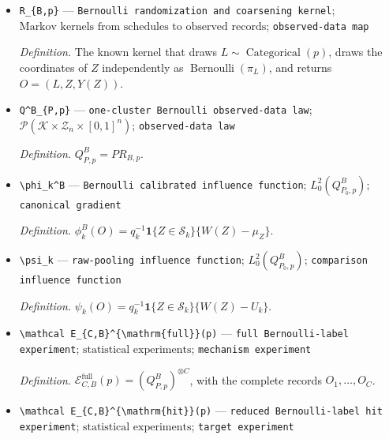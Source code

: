 \documentclass{article}
\begin{document}
\begin{itemize}
  \item \texttt{R\_\allowbreak{}\{B,\allowbreak{}p\}\allowbreak{}} --- \texttt{Bernoulli randomization and coarsening kernel}; \(\text{Markov kernels from schedules to observed records}\); \texttt{observed-\allowbreak{}data map}
  \par\smallskip\noindent\emph{Definition.} The known kernel that draws \(L\sim\operatorname{Categorical}(p)\), draws the coordinates of \(Z\) independently as \(\operatorname{Bernoulli}(\pi_L)\), and returns \(O=(L,Z,Y(Z))\).
  \item \texttt{Q\textasciicircum{}B\_\allowbreak{}\{P,\allowbreak{}p\}\allowbreak{}} --- \texttt{one-\allowbreak{}cluster Bernoulli observed-\allowbreak{}data law}; \(\mathcal P(\mathcal K\times\mathcal Z_n\times[0,1]^n)\); \texttt{observed-\allowbreak{}data law}
  \par\smallskip\noindent\emph{Definition.} \(Q^B_{P,p}=P R_{B,p}\).
  \item \texttt{\textbackslash{}\allowbreak{}phi\_\allowbreak{}k\textasciicircum{}B} --- \texttt{Bernoulli calibrated influence function}; \(L^2_0(Q^B_{P_0,p})\); \texttt{canonical gradient}
  \par\smallskip\noindent\emph{Definition.} \(\phi_k^B(O)=q_k^{-1}\mathbf 1\{Z\in\mathcal S_k\}\{W(Z)-\mu_Z\}\).
  \item \texttt{\textbackslash{}\allowbreak{}psi\_\allowbreak{}k} --- \texttt{raw-\allowbreak{}pooling influence function}; \(L^2_0(Q^B_{P_0,p})\); \texttt{comparison influence function}
  \par\smallskip\noindent\emph{Definition.} \(\psi_k(O)=q_k^{-1}\mathbf 1\{Z\in\mathcal S_k\}\{W(Z)-U_k\}\).
  \item \texttt{\textbackslash{}\allowbreak{}mathcal E\_\allowbreak{}\{C,\allowbreak{}B\}\allowbreak{}\textasciicircum{}\{\textbackslash{}\allowbreak{}mathrm\{full\}\allowbreak{}\}\allowbreak{}(p)} --- \texttt{full Bernoulli-\allowbreak{}label experiment}; \(\text{statistical experiments}\); \texttt{mechanism experiment}
  \par\smallskip\noindent\emph{Definition.} \(\mathcal E_{C,B}^{\mathrm{full}}(p)=(Q^B_{P,p})^{\otimes C}\), with the complete records \(O_1,\ldots,O_C\).
  \item \texttt{\textbackslash{}\allowbreak{}mathcal E\_\allowbreak{}\{C,\allowbreak{}B\}\allowbreak{}\textasciicircum{}\{\textbackslash{}\allowbreak{}mathrm\{hit\}\allowbreak{}\}\allowbreak{}(p)} --- \texttt{reduced Bernoulli-\allowbreak{}label hit experiment}; \(\text{statistical experiments}\); \texttt{target experiment}

\end{itemize}
\end{document}

